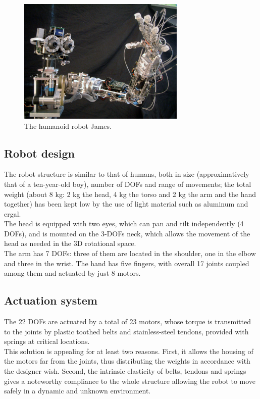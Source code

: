 \documentclass[conference]{IEEEtran}
\numberwithin{equation}{section}
\begin{document}
\begin{figure}[h!tbp]
\centering
\includegraphics[width=80mm]{image/James1.png}
\caption{The humanoid robot James.}
\label{Fig:PicureJames}
\end{figure}

\subsection{Robot design}

The robot structure is similar to that of humans, both in size (approximatively that of a ten-year-old boy), number of DOFs and range of movements; the total weight (about 8 kg: 2 kg the head, 4 kg the torso and 2 kg the arm and the hand together) has been kept low by the use of light material such as aluminum and ergal.\\The head is equipped with two eyes, which can pan and tilt independently (4 DOFs), and is mounted on the 3-DOFs neck, which allows the movement of the head as needed in the 3D rotational space.\\The arm has 7 DOFs: three of them are located in the shoulder, one in the elbow and three in the wrist. The hand has five fingers, with overall 17 joints coupled among them and actuated by just 8 motors.


\subsection{Actuation system}

The 22 DOFs are actuated by a total of 23 motors, whose torque is transmitted to the joints by plastic toothed belts and stainless-steel tendons, provided with springs at critical locations.\\This solution is appealing for at least two reasons. First, it allows the housing of the motors far from the joints, thus distributing the weights in accordance with the designer wish. Second, the intrinsic elasticity of belts, tendons and springs gives a noteworthy compliance to the whole structure allowing the robot to move safely in a dynamic and unknown environment.
\end{document}
